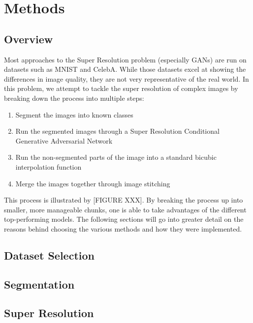 \section{Methods}

\subsection{Overview}
Most approaches to the Super Resolution problem (especially GANs) are run on
datasets such as MNIST and CelebA. While those datasets excel at showing the
differences in image quality, they are not very representative of the real
world. In this problem, we attempt to tackle the super resolution of complex
images by breaking down the process into multiple steps:

\begin{enumerate}
	\item Segment the images into known classes
	\item Run the segmented images through a Super Resolution Conditional Generative Adversarial Network
	\item Run the non-segmented parts of the image into a standard bicubic interpolation function
	\item Merge the images together through image stitching

\end{enumerate}

This process is illustrated by [FIGURE XXX]. By breaking the process up into smaller, more manageable chunks, one is able to take advantages of the different top-performing models. The following sections will go into greater detail on the reasons behind choosing the various methods and how they were implemented.

\subsection{Dataset Selection}

\subsection{Segmentation}

\subsection{Super Resolution}
